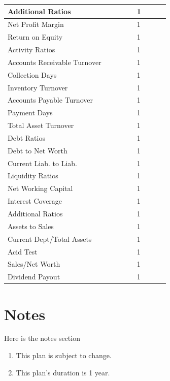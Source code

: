 \documentclass[11pt,a4paper,titlepage]{article}
\begin{document}
\begin{landscape}
\begin{scriptsize}
\begin{tabular}{ | l | l | l | l | l | l | l | l | l |}
  Additional Ratios & & & & & 1\\\hline
  Net Profit Margin & & & & & 1\\\hline
  Return on Equity & & & & & 1\\\hline
  Activity Ratios & & & & & 1\\\hline
  Accounts Receivable Turnover & & & & & 1\\\hline
  Collection Days & & & & & 1\\\hline
  Inventory Turnover & & & & & 1\\\hline
  Accounts Payable Turnover & & & & & 1\\\hline
  Payment Days & & & & & 1\\\hline
  Total Asset Turnover & & & & & 1\\\hline
  Debt Ratios & & & & & 1\\\hline
  Debt to Net Worth & & & & & 1\\\hline
  Current Liab. to Liab. & & & & & 1\\\hline
  Liquidity Ratios & & & & & 1\\\hline
  Net Working Capital & & & & & 1\\\hline
  Interest Coverage & & & & & 1\\\hline
  Additional Ratios & & & & & 1\\\hline
  Assets to Sales & & & & & 1\\\hline
  Current Dept/Total Assets & & & & & 1\\\hline
  Acid Test & & & & & 1\\\hline
  Sales/Net Worth & & & & & 1\\\hline
  Dividend Payout & & & & & 1\\\hline
\end{tabular}
\end{scriptsize}
\end{landscape}

\pagebreak

\section{Notes}
Here is the notes section
\begin{enumerate}
\item This plan is subject to change.
\item This plan's duration is 1 year.
\end{enumerate}
\end{document}
